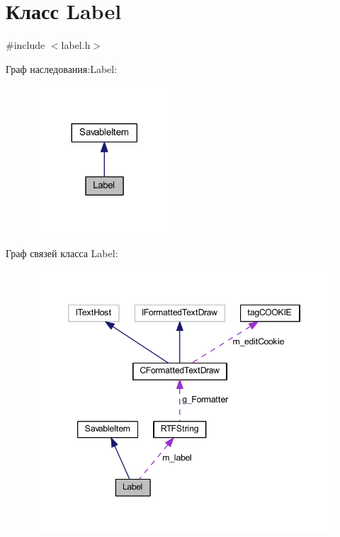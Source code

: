 \hypertarget{class_label}{\section{Класс Label}
\label{class_label}
}


{\ttfamily \#include $<$label.\-h$>$}



Граф наследования\-:Label\-:
\nopagebreak
\begin{figure}[H]
\begin{center}
\leavevmode
\includegraphics[width=149pt]{class_label__inherit__graph}
\end{center}
\end{figure}


Граф связей класса Label\-:
\nopagebreak
\begin{figure}[H]
\begin{center}
\leavevmode
\includegraphics[width=346pt]{class_label__coll__graph}
\end{center}
\end{figure}
